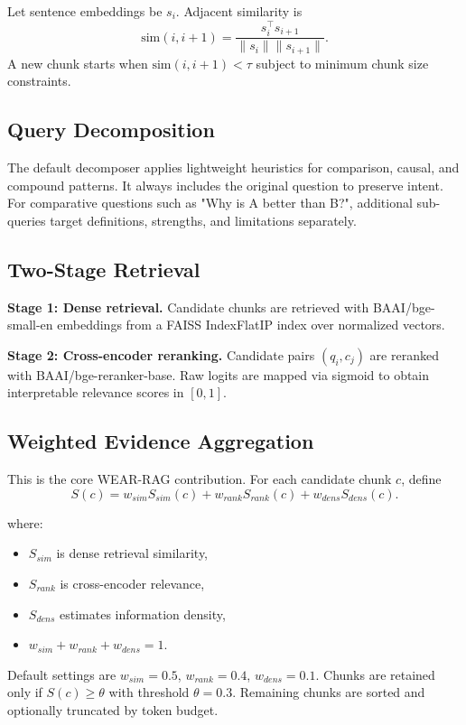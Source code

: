 \documentclass[10pt,draftclsnofoot,onecolumn,journal]{IEEEtran}
\begin{document}
Let sentence embeddings be $s_i$. Adjacent similarity is
\begin{equation}
\text{sim}(i,i+1) = \frac{s_i^\top s_{i+1}}{\|s_i\|\|s_{i+1}\|}.
\end{equation}
A new chunk starts when $\text{sim}(i,i+1) < \tau$ subject to minimum chunk size constraints.

\subsection{Query Decomposition}
The default decomposer applies lightweight heuristics for comparison, causal, and compound patterns. It always includes the original question to preserve intent. For comparative questions such as "Why is A better than B?", additional sub-queries target definitions, strengths, and limitations separately.

\subsection{Two-Stage Retrieval}
\textbf{Stage 1: Dense retrieval.} Candidate chunks are retrieved with BAAI/bge-small-en embeddings from a FAISS IndexFlatIP index over normalized vectors.

\textbf{Stage 2: Cross-encoder reranking.} Candidate pairs $(q_i, c_j)$ are reranked with BAAI/bge-reranker-base. Raw logits are mapped via sigmoid to obtain interpretable relevance scores in $[0,1]$.

\subsection{Weighted Evidence Aggregation}
This is the core WEAR-RAG contribution. For each candidate chunk $c$, define
\begin{equation}
S(c) = w_{sim}S_{sim}(c) + w_{rank}S_{rank}(c) + w_{dens}S_{dens}(c).
\label{eq:evidence}
\end{equation}

where:
\begin{itemize}
\item $S_{sim}$ is dense retrieval similarity,
\item $S_{rank}$ is cross-encoder relevance,
\item $S_{dens}$ estimates information density,
\item $w_{sim}+w_{rank}+w_{dens}=1$.
\end{itemize}

Default settings are $w_{sim}=0.5$, $w_{rank}=0.4$, $w_{dens}=0.1$. Chunks are retained only if $S(c) \geq \theta$ with threshold $\theta=0.3$. Remaining chunks are sorted and optionally truncated by token budget.
\end{document}
